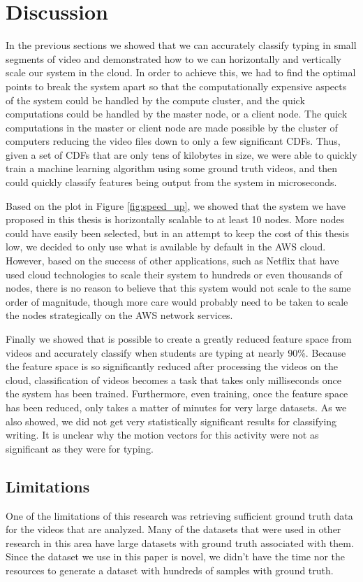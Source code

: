 \section{Discussion}
In the previous sections we showed that we can accurately classify typing in
small segments of video and demonstrated how to we can horizontally and vertically
scale our system in the cloud. In order to achieve this, we had to find the
optimal points to break the system apart so that the computationally
expensive aspects of the system could be handled by the compute cluster, and the
quick computations could be handled by the master node, or a client node.
The quick computations in the master or client node are made possible by the
cluster of computers reducing the video files down to only a few significant
CDFs. Thus, given a set of CDFs that are only tens of kilobytes in size, we
were able to quickly train a machine learning algorithm using some ground truth
videos, and then could quickly classify features being output from the system
in microseconds.

Based on the plot in Figure \ref{fig:speed_up}, we showed that the system
we have proposed in this thesis is horizontally scalable to at least 10 nodes.
More nodes could have easily been selected, but in an attempt to keep the cost
of this thesis low, we decided to only use what is available by default in the
AWS cloud. However, based on the success of other applications, such as
Netflix that have used cloud technologies to scale their system to hundreds
or even thousands of nodes, there is no reason to believe that this system
would not scale to the same order of magnitude, though more care would probably
need to be taken to scale the nodes strategically on the AWS network services.

Finally we showed that is possible to create a greatly reduced feature space
from videos and accurately classify when students are typing at nearly 90\%.
Because the feature space is so significantly reduced after processing the
videos on the cloud, classification of videos becomes a task that takes only
milliseconds once the system has been trained. Furthermore, even training, once
the feature space has been reduced, only takes a matter of minutes for very
large datasets. As we also showed, we did not get very statistically significant
results for classifying writing. It is unclear why the motion vectors for this
activity were not as significant as they were for typing.

\subsection{Limitations}
One of the limitations of this research was retrieving sufficient ground truth
data for the videos that are analyzed. Many of the datasets that were
used in other research in this area have large datasets with ground truth
associated with them. Since the dataset we use in this paper is novel, we didn't
have the time nor the resources to generate a dataset with hundreds of samples
with ground truth.

